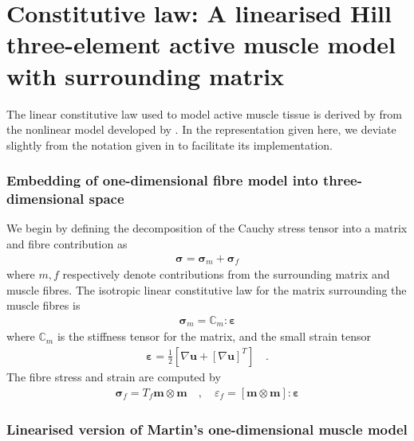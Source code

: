 \documentclass[]{scrartcl}
\begin{document}
\section{Constitutive law: A linearised Hill three-element active muscle model with surrounding matrix \citep{Kajee2013a}}

The linear constitutive law used to model active muscle tissue is derived by \citep{Kajee2013a} from the nonlinear model developed by \citep{Martins1998a,Martins2006a}.
In the representation given here, we deviate slightly from the notation given in \citep{Kajee2013a} to facilitate its implementation.

\subsubsection*{Embedding of one-dimensional fibre model into three-dimensional space}

We begin by defining the decomposition of the Cauchy stress tensor into a matrix and fibre contribution as
\begin{gather}
\boldsymbol{\sigma}
  = \boldsymbol{\sigma}_{m} + \boldsymbol{\sigma}_{f}
\end{gather}
where $m,f$ respectively denote contributions from the surrounding matrix and muscle fibres.
The isotropic linear constitutive law for the matrix surrounding the muscle fibres is
\begin{gather}
\boldsymbol{\sigma}_{m}
  = \boldsymbol{\mathbb{C}}_{m} : \boldsymbol{\varepsilon}
\end{gather}
where 
$\boldsymbol{\mathbb{C}}_{m}$ is the stiffness tensor for the matrix, and
the small strain tensor
\begin{gather}
\boldsymbol{\varepsilon} 
  = \frac{1}{2} \left[ \nabla \mathbf{u} + \left[ \nabla \mathbf{u} \right]^{T} \right]
\quad .
\end{gather}
The fibre stress and strain are computed by
\begin{gather}
\boldsymbol{\sigma}_{f}
  = T_{f} \mathbf{m} \otimes \mathbf{m}
\quad , \quad
\varepsilon_{f}
  = \left[ \mathbf{m} \otimes \mathbf{m} \right] : \boldsymbol{\varepsilon}
\end{gather}

\subsubsection*{Linearised version of Martin's one-dimensional muscle model}
\end{document}
